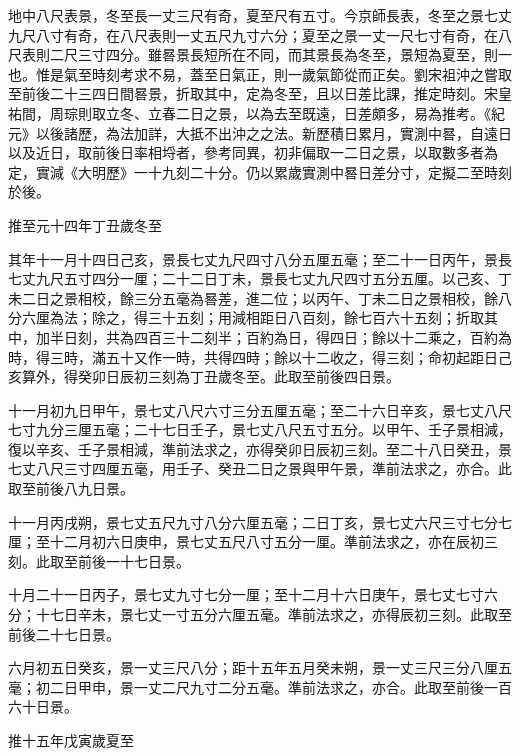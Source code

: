 \begin{pinyinscope}
 地中八尺表景，冬至長一丈三尺有奇，夏至尺有五寸。今京師長表，冬至之景七丈九尺八寸有奇，在八尺表則一丈五尺九寸六分；夏至之景一丈一尺七寸有奇，在八尺表則二尺三寸四分。雖晷景長短所在不同，而其景長為冬至，景短為夏至，則一也。惟是氣至時刻考求不易，蓋至日氣正，則一歲氣節從而正矣。劉宋祖沖之嘗取至前後二十三四日間晷景，折取其中，定為冬至，且以日差比課，推定時刻。宋皇祐間，周琮則取立冬、立春二日之景，以為去至既遠，日差頗多，易為推考。《紀元》以後諸歷，為法加詳，大抵不出沖之之法。新歷積日累月，實測中晷，自遠日以及近日，取前後日率相埒者，參考同異，初非偏取一二日之景，以取數多者為定，實減《大明歷》一十九刻二十分。仍以累歲實測中晷日差分寸，定擬二至時刻於後。



 推至元十四年丁丑歲冬至



 其年十一月十四日己亥，景長七丈九尺四寸八分五厘五毫；至二十一日丙午，景長七丈九尺五寸四分一厘；二十二日丁未，景長七丈九尺四寸五分五厘。以己亥、丁未二日之景相校，餘三分五毫為晷差，進二位；以丙午、丁未二日之景相校，餘八分六厘為法；除之，得三十五刻；用減相距日八百刻，餘七百六十五刻；折取其中，加半日刻，共為四百三十二刻半；百約為日，得四日；餘以十二乘之，百約為時，得三時，滿五十又作一時，共得四時；餘以十二收之，得三刻；命初起距日己亥算外，得癸卯日辰初三刻為丁丑歲冬至。此取至前後四日景。



 十一月初九日甲午，景七丈八尺六寸三分五厘五毫；至二十六日辛亥，景七丈八尺七寸九分三厘五毫；二十七日壬子，景七丈八尺五寸五分。以甲午、壬子景相減，復以辛亥、壬子景相減，準前法求之，亦得癸卯日辰初三刻。至二十八日癸丑，景七丈八尺三寸四厘五毫，用壬子、癸丑二日之景與甲午景，準前法求之，亦合。此取至前後八九日景。



 十一月丙戌朔，景七丈五尺九寸八分六厘五毫；二日丁亥，景七丈六尺三寸七分七厘；至十二月初六日庚申，景七丈五尺八寸五分一厘。準前法求之，亦在辰初三刻。此取至前後一十七日景。



 十月二十一日丙子，景七丈九寸七分一厘；至十二月十六日庚午，景七丈七寸六分；十七日辛未，景七丈一寸五分六厘五毫。準前法求之，亦得辰初三刻。此取至前後二十七日景。



 六月初五日癸亥，景一丈三尺八分；距十五年五月癸未朔，景一丈三尺三分八厘五毫；初二日甲申，景一丈二尺九寸二分五毫。準前法求之，亦合。此取至前後一百六十日景。



 推十五年戊寅歲夏至




\end{pinyinscope}
